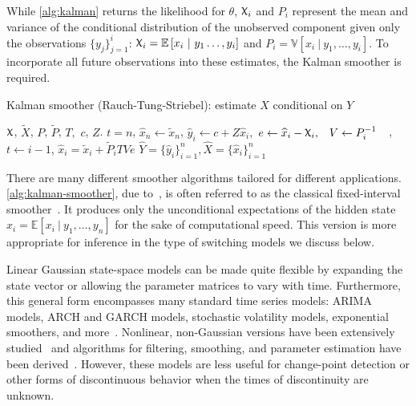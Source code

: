\documentclass[12pt]{article}
\renewcommand{\hat}{\widehat}
\DeclareRobustCommand{\varx}{{\mathpalette\irchi\relax}}
\newcommand{\irchi}[2]{\protect\raisebox{\depth}{$#1\upchi$}}
\newcommand{\given}{\ \vert\ }
\newcommand{\E}{\mathbb{E}}
\newcommand{\Expect}[1]{\E\left[#1\right]}
\newcommand{\Var}[1]{\mathbb{V}\left[#1\right]}
\begin{document}

While \autoref{alg:kalman} returns the likelihood for $\theta$, 
$\varx_i$ and $P_i$ represent the mean and variance of the conditional distribution
of the unobserved component given only the observations
$\{y_j\}_{j=1}^i$: $\varx_i=\Expect{x_i\given y_1\ldots,y_i}$ and
$P_i=\Var{x_i\given y_1,\ldots,y_i}$. To
incorporate all future observations into these estimates, the Kalman
smoother is required.
\begin{algorithm}[t!]
  \begin{singlespace}
  \caption{Kalman smoother (Rauch-Tung-Striebel): estimate $\hat{X}$ conditional on
    $Y$\label{alg:kalman-smoother}} 
  \begin{algorithmic}
     $\varx$, $\widetilde{X}$, $P$, $\widetilde{P}$,
    $T,$ $c$, $Z$.
    \STATE $t=n$,
    \STATE $\hat{x}_{n}\leftarrow \widetilde{x}_n$, 
    \STATE $\hat{y}_i \leftarrow c + Z\hat{x}_i,$
    \STATE $\begin{aligned} e &\leftarrow \hat{x}_i -
      \varx_i, & V &\leftarrow P_i^{-1}\end{aligned}$,
    \STATE $t\leftarrow i-1$, 
    \STATE $\hat{x}_i = \widetilde{x}_i + \widetilde{P}_i T Ve $ 
    \ENDWHILE
    \RETURN $\widehat{Y}=\{\hat{y}_i\}_{i=1}^n, \hat{X}=\{\hat{x}_i\}_{i=1}^n$
  \end{algorithmic}
\end{singlespace}
\end{algorithm}
There are many different smoother algorithms tailored for different
applications. \autoref{alg:kalman-smoother}, due
to~\citet{RauchStriebel1965}, is often referred to as the classical
fixed-interval smoother~\citep{AndersonMoore1979}. It produces only
the unconditional expectations of the hidden state
$\hat{x}_i=\Expect{x_i\given y_1,\ldots,y_n}$ for the sake of
computational speed. This version is more appropriate for inference in
the type of switching models we discuss below.


Linear Gaussian state-space models can be made quite flexible
by expanding the state vector or allowing the parameter matrices to
vary with time. Furthermore, this general form encompasses many
standard time series models: ARIMA models, ARCH and GARCH models,
stochastic volatility models, exponential smoothers, and
more~\citep[see][for many other
examples]{DurbinKoopman2001}. Nonlinear, non-Gaussian versions have
been extensively
studied~\citep{DurbinKoopman1997,Fuh2006,Kitagawa1987,Kitagawa1996}
and algorithms for filtering, smoothing, and parameter estimation have
been derived~\citep[e.g.,][]{KoyamaPerez-Bolde2010,AndrieuDoucet2010}. 
However, these models are less useful
for change-point detection or other forms of discontinuous behavior
when the times of discontinuity are unknown. 
\end{document}
